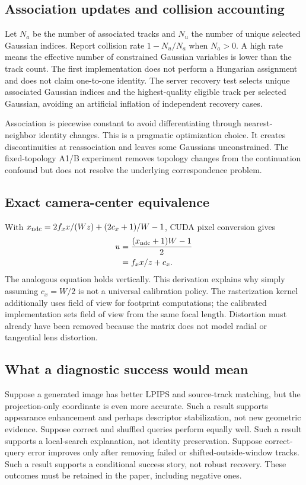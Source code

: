 \documentclass[10pt,twocolumn,letterpaper]{article}
\begin{document}
\subsection{Association updates and collision accounting}
Let $N_a$ be the number of associated tracks and $N_u$ the number of unique selected Gaussian indices. Report collision rate $1-N_u/N_a$ when $N_a>0$. A high rate means the effective number of constrained Gaussian variables is lower than the track count. The first implementation does not perform a Hungarian assignment and does not claim one-to-one identity. The server recovery test selects unique associated Gaussian indices and the highest-quality eligible track per selected Gaussian, avoiding an artificial inflation of independent recovery cases.

Association is piecewise constant to avoid differentiating through nearest-neighbor identity changes. This is a pragmatic optimization choice. It creates discontinuities at reassociation and leaves some Gaussians unconstrained. The fixed-topology A1/B experiment removes topology changes from the continuation confound but does not resolve the underlying correspondence problem.

\subsection{Exact camera-center equivalence}
With $x_{\rm ndc}=2f_xx/(Wz)+(2c_x+1)/W-1$, CUDA pixel conversion gives
\begin{align}
u&=\frac{(x_{\rm ndc}+1)W-1}{2}\\
&=f_xx/z+c_x.
\end{align}
The analogous equation holds vertically. This derivation explains why simply assuming $c_x=W/2$ is not a universal calibration policy. The rasterization kernel additionally uses field of view for footprint computations; the calibrated implementation sets field of view from the same focal length. Distortion must already have been removed because the matrix does not model radial or tangential lens distortion.

\subsection{What a diagnostic success would mean}
Suppose a generated image has better LPIPS and source-track matching, but the projection-only coordinate is even more accurate. Such a result supports appearance enhancement and perhaps descriptor stabilization, not new geometric evidence. Suppose correct and shuffled queries perform equally well. Such a result supports a local-search explanation, not identity preservation. Suppose correct-query error improves only after removing failed or shifted-outside-window tracks. Such a result supports a conditional success story, not robust recovery. These outcomes must be retained in the paper, including negative ones.
\end{document}

